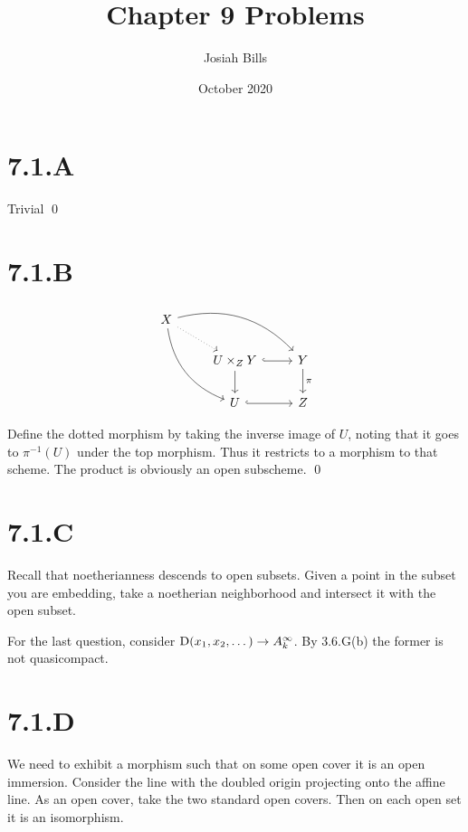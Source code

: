 \documentclass{article}
\title{Chapter 9 Problems}
\author{Josiah Bills}
\date{October 2020}
\begin{document}
\maketitle

\section{7.1.A}
Trivial \qed

\section{7.1.B}
\[
    \begin{tikzcd}
        X \ar[drr, bend left] \ar[ddr, bend right] \ar[dr, dotted] &
                                                                   &
        \\
                                                                   & U \times_Z
        Y \ar[d] \ar[r, hook]                                      & Y \ar[d,
            "\pi"]
        \\
                                                                   & U \ar[r,
        hook]                                                      & Z
    \end{tikzcd}
\]

Define the dotted morphism by taking the inverse image of $U$, noting that it
goes to $\pi^{-1}(U)$ under the top morphism. Thus it restricts to a morphism
to that scheme. The product is obviously an open subscheme. \qed

\section{7.1.C}
Recall that noetherianness descends to open subsets. Given a point in the
subset you are embedding, take a noetherian neighborhood and intersect it with
the open subset.

For the last question, consider $\operatorname{D}(x_1, x_2, \dots) \to A^{\infty}_k$. By
3.6.G(b) the former is not quasicompact.

\section{7.1.D}
We need to exhibit a morphism such that on some open cover it is an open
immersion. Consider the line with the doubled origin projecting onto the affine
line. As an open cover, take the two standard open covers. Then on each open
set it is an isomorphism.
\end{document}
